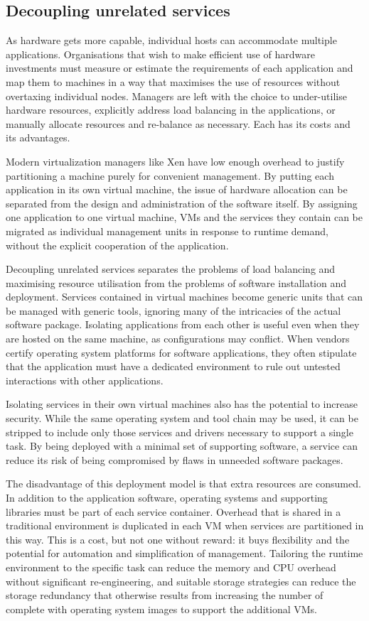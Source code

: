 \subsection{Decoupling unrelated services}

As hardware gets more capable, individual hosts can accommodate multiple applications. Organisations that wish to make efficient use of hardware investments must measure or estimate the requirements of each application and map them to machines in a way that maximises the use of resources without overtaxing individual nodes. Managers are left with the choice to under-utilise hardware resources, explicitly address load balancing in the applications, or manually allocate resources and re-balance as necessary. Each has its costs and its advantages.

Modern virtualization managers like Xen have low enough overhead to justify partitioning a machine purely for convenient management. By putting each application in its own virtual machine, the issue of hardware allocation can be separated from the design and administration of the software itself. By assigning one application to one virtual machine, VMs and the services they contain can be migrated as individual management units in response to runtime demand, without the explicit cooperation of the application.

Decoupling unrelated services separates the problems of load balancing and maximising resource utilisation from the problems of software installation and deployment. Services contained in virtual machines become generic units that can be managed with generic tools, ignoring many of the intricacies of the actual software package. Isolating applications from each other is useful even when they are hosted on the same machine, as configurations may conflict. When vendors certify operating system platforms for software applications, they often stipulate that the application must have a dedicated environment to rule out untested interactions with other applications.

Isolating services in their own virtual machines also has the potential to increase security. While the same operating system and tool chain may be used, it can be stripped to include only those services and drivers necessary to support a single task. By being deployed with a minimal set of supporting software, a service can reduce its risk of being compromised by flaws in unneeded software packages.

The disadvantage of this deployment model is that extra resources are consumed. In addition to the application software, operating systems and supporting libraries must be part of each service container. Overhead that is shared in a traditional environment is duplicated in each VM when services are partitioned in this way. This is a cost, but not one without reward: it buys flexibility and the potential for automation and simplification of management. Tailoring the runtime environment to the specific task can reduce the memory and CPU overhead without significant re-engineering, and suitable storage strategies can reduce the storage redundancy that otherwise results from increasing the number of complete with operating system images to support the additional VMs.

